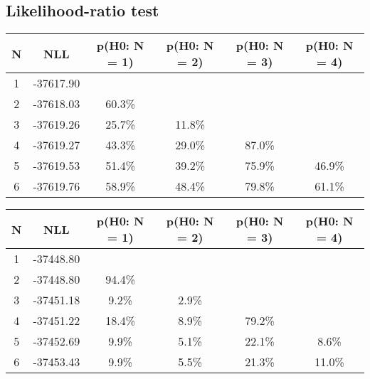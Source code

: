 \subsection{Likelihood-ratio test}
\begin{table}[htb]
	\begin{center}
{\footnotesize\renewcommand{\arraystretch}{1.4}
		\begin{tabular}{cc||cccc}
			N & NLL & p(H0: N = 1) & p(H0: N = 2) & p(H0: N = 3) & p(H0: N = 4)\\ 
		\hline
1 & -37617.90 & & & & \\
2 & -37618.03 & 60.3\% & & & \\
3 & -37619.26 & 25.7\% & 11.8\% & & \\
4 & -37619.27 & 43.3\% & 29.0\% & 87.0\% & \\
5 & -37619.53 & 51.4\% & 39.2\% & 75.9\% & 46.9\% \\
6 & -37619.76 & 58.9\% & 48.4\% & 79.8\% & 61.1\% \\
	\end{tabular}
		\label{tab:lab}
	}
	\end{center}\end{table}

\begin{table}[htb]
	\begin{center}
{\footnotesize\renewcommand{\arraystretch}{1.4}
		\begin{tabular}{cc||cccc}
			N & NLL & p(H0: N = 1) & p(H0: N = 2) & p(H0: N = 3) & p(H0: N = 4)\\ 
		\hline
1 & -37448.80 & & & & \\
2 & -37448.80 & 94.4\% & & & \\
3 & -37451.18 & 9.2\% & 2.9\% & & \\
4 & -37451.22 & 18.4\% & 8.9\% & 79.2\% & \\
5 & -37452.69 & 9.9\% & 5.1\% & 22.1\% & 8.6\% \\
6 & -37453.43 & 9.9\% & 5.5\% & 21.3\% & 11.0\% \\
	\end{tabular}
		\label{tab:lab}
	}
	\end{center}\end{table}

